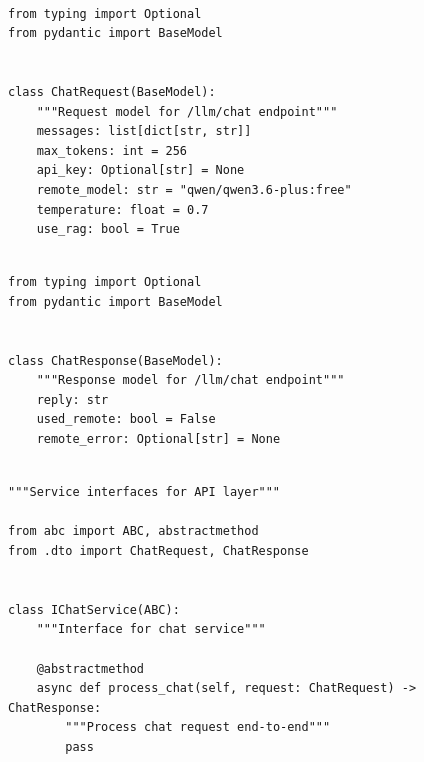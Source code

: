 \begin{lstlisting}[basicstyle=\tiny\ttfamily,breaklines=true]

from typing import Optional
from pydantic import BaseModel


class ChatRequest(BaseModel):
    """Request model for /llm/chat endpoint"""
    messages: list[dict[str, str]]
    max_tokens: int = 256
    api_key: Optional[str] = None
    remote_model: str = "qwen/qwen3.6-plus:free"
    temperature: float = 0.7
    use_rag: bool = True
\end{lstlisting}

\begin{lstlisting}[basicstyle=\tiny\ttfamily,breaklines=true]

from typing import Optional
from pydantic import BaseModel


class ChatResponse(BaseModel):
    """Response model for /llm/chat endpoint"""
    reply: str
    used_remote: bool = False
    remote_error: Optional[str] = None
\end{lstlisting}

\begin{lstlisting}[basicstyle=\tiny\ttfamily,breaklines=true]

"""Service interfaces for API layer"""

from abc import ABC, abstractmethod
from .dto import ChatRequest, ChatResponse


class IChatService(ABC):
    """Interface for chat service"""

    @abstractmethod
    async def process_chat(self, request: ChatRequest) -> ChatResponse:
        """Process chat request end-to-end"""
        pass
\end{lstlisting}

